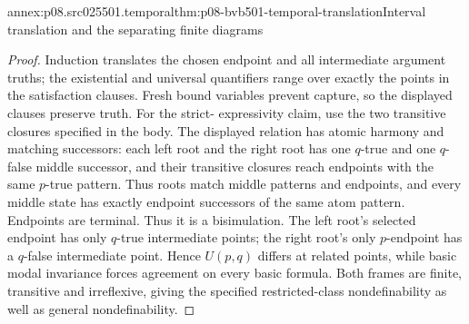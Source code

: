 \begin{annexitem}{annex:p08.src025501.temporal}{thm:p08-bvb501-temporal-translation}{Interval translation and the separating finite diagrams}
\begin{proof}
Induction translates the chosen endpoint and all intermediate argument
truths; the existential and universal quantifiers range over exactly
the points in the satisfaction clauses. Fresh bound variables prevent
capture, so the displayed clauses preserve truth. For the strict-
expressivity claim, use the two transitive closures specified in the body.
The displayed relation has atomic harmony and matching successors:
each left root and the right root has one \(q\)-true and one
\(q\)-false middle successor, and their transitive closures reach
endpoints with the same \(p\)-true pattern. Thus roots match middle
patterns and endpoints,
and every middle state has exactly endpoint successors of the same
atom pattern. Endpoints are terminal. Thus it is a bisimulation.
The left root's selected endpoint has only \(q\)-true intermediate
points; the right root's only \(p\)-endpoint has a \(q\)-false
intermediate point. Hence \(U(p,q)\) differs at related points,
while basic modal invariance forces agreement on every basic formula.
Both frames are finite, transitive and irreflexive, giving the specified
restricted-class nondefinability as well as general nondefinability.
\end{proof}
\end{annexitem}

